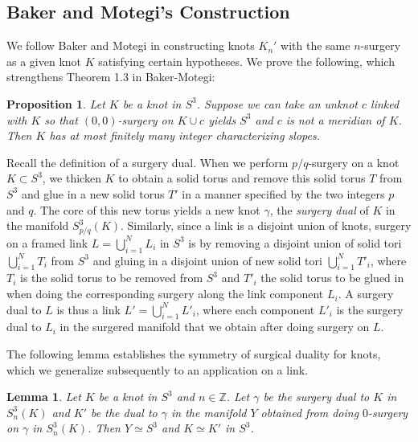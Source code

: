 \documentclass[11pt,usenames,dvipsnames,reqno]{amsart}
\numberwithin{theorem}{section}
\newtheorem{lemma}[theorem]{Lemma}
\newtheorem{proposition}[theorem]{Proposition}
\theoremstyle{ex}
\theoremstyle{rem}
\begin{document}
\subsection{Baker and Motegi's Construction} We follow Baker and Motegi \cite{baker-motegi} in constructing knots $K_n'$ with the same $n$-surgery as a given knot $K$ satisfying certain hypotheses. We prove the following, which strengthens Theorem 1.3 in Baker-Motegi:

\begin{proposition}\label{prop 2.3}
	Let $K$ be a knot in $S^3$. Suppose we can take an unknot $c$ linked with $K$ so that $(0,0)$-surgery on $K\cup c$ yields $S^3$ and $c$ is not a meridian of $K$. Then $K$ has at most finitely many integer characterizing slopes.
\end{proposition}

Recall the definition of a surgery dual. When we perform $p/q$-surgery on a knot $K\subset S^3$, we thicken $K$ to obtain a solid torus and remove this solid torus $T$ from $S^3$ and glue in a new solid torus $T'$ in a manner specified by the two integers $p$ and $q$. The core of this new torus yields a new knot $\gamma$, the \textit{surgery dual} of $K$ in the manifold $S^3_{p/q}(K)$. Similarly, since a link is a disjoint union of knots, surgery on a framed link $L =\bigcup^{N}_{i=1} L_i$ in $S^3$ is by removing a disjoint union of solid tori $\bigcup^{N}_{i=1} T_i$ from $S^3$ and gluing in a disjoint union of new solid tori $\bigcup^{N}_{i=1} T'_i$, where $T_i$ is the solid torus to be removed from $S^3$ and $T'_i$ the solid torus to be glued in when doing the corresponding surgery along the link component $L_i$. A surgery dual to $L$ is thus a link $L' = \bigcup^{N}_{i=1} L'_i$, where each component $L'_i$ is the surgery dual to $L_i$ in the surgered manifold that we obtain after doing surgery on $L$.

The following lemma establishes the symmetry of surgical duality for knots, which we generalize subsequently to an application on a link.

\begin{lemma}
	Let $K$ be a knot in $S^3$ and $n\in\mathbb{Z}$. Let $\gamma$ be the surgery dual to $K$ in $S^3_n(K)$ and $K'$ be the dual to $\gamma$ in the manifold $Y$ obtained from doing $0$-surgery on $\gamma$ in $S^3_n(K)$. Then $Y\simeq S^3$ and $K\simeq K'$ in $S^3$.
\end{lemma}
\end{document}
